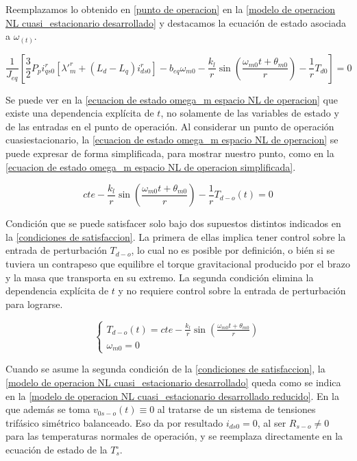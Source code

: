 \documentclass[a4paper, 10pt, onecolumn,journal]{ieeeconf}
\begin{document}
Reemplazamos lo obtenido en \cref{punto de operacion} en la \cref{modelo de operacion NL cuasi_estacionario desarrollado}
y destacamos la ecuación de estado asociada a $\omega_(t)$.

\begin{equation}    
    \frac{1}{J_{eq}}\left[\frac{3}{2} P_p i^r_{qs0}\left[\lambda'^r_m + (L_d - L_q) i^r_{ds0} \right] - b_{eq}\omega_{m0} - \frac{k_l}{r}\sin\left(\frac{\omega_{m0}t + \theta_{m0}}{r}\right) - \frac{1}{r}T_{d0}\right] = 0
    \label{ecuacion de estado omega_m espacio NL de operacion}
\end{equation}

Se puede ver en la \cref{ecuacion de estado omega_m espacio NL de operacion} que 
existe una dependencia explícita de $t$, no solamente de las variables de 
estado y de las entradas en el punto de operación. Al considerar
un punto de operación cuasiestacionario, la \cref{ecuacion de estado omega_m espacio NL de operacion}
se puede expresar de forma simplificada, para mostrar nuestro punto, como en la \cref{ecuacion de estado omega_m espacio NL de operacion simplificada}.

\begin{equation}    
    cte - \frac{k_l}{r}\sin\left(\frac{\omega_{m0}t + \theta_{m0}}{r}\right) - \frac{1}{r}T_{d-o}(t) = 0
    \label{ecuacion de estado omega_m espacio NL de operacion simplificada}
\end{equation}

Condición que se puede satisfacer solo bajo dos supuestos distintos indicados en la \cref{condiciones de satisfaccion}.
La primera de ellas implica tener control sobre la entrada de perturbación $T_{d-o}$, lo cual
no es posible por definición, o bién si se tuviera un contrapeso que equilibre el torque
gravitacional producido por el brazo y la masa que transporta en su extremo. La segunda condición
elimina la dependencia explícita de $t$ y no requiere control sobre la entrada de perturbación para
lograrse.

\begin{equation}
    \begin{cases}
        T_{d-o}(t) = cte - \frac{k_l}{r}\sin\left(\frac{\omega_{m0}t + \theta_{m0}}{r}\right)\\
        \omega_{m0} = 0
    \end{cases}
    \label{condiciones de satisfaccion}
\end{equation}

Cuando se asume la segunda condición de la \cref{condiciones de satisfaccion},
la \cref{modelo de operacion NL cuasi_estacionario desarrollado} queda como se indica en la 
\cref{modelo de operacion NL cuasi_estacionario desarrollado reducido}. En la que
además se toma $v_{0s-o}(t) \equiv 0$ al tratarse de un sistema de
tensiones trifásico simétrico balanceado. Eso da por resultado $i_{ds0} = 0$,
al ser $R_{s-o} \neq 0$ para las temperaturas normales de operación, y se reemplaza directamente en la 
ecuación de estado de la $T^{\circ}_{s}$.
\end{document}
